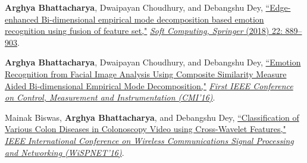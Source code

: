 \documentclass[letterpaper,10pt]{article}
\begin{document}
\item {\textbf{Arghya Bhattacharya}, Dwaipayan Choudhury, and Debangshu Dey, \href{https://doi.org/10.1007/s00500-016-2395-4}{``Edge-enhanced Bi-dimensional empirical mode decomposition based emotion recognition using fusion of feature set,"} \href{https://www.springer.com/journal/500}{\textit{Soft Computing, Springer} (2018) 22: 889--903}.}

\item {\textbf{Arghya Bhattacharya}, Dwaipayan Choudhury, and Debangshu Dey, \href{https://doi.org/10.1109/CMI.2016.7413766}{``Emotion Recognition from Facial Image Analysis Using Composite Similarity Measure Aided Bi-dimensional Empirical Mode Decomposition,"} \href{https://ieeexplore.ieee.org/xpl/conhome/7400053/proceeding}{\textit{First IEEE Conference on Control, Measurement and Instrumentation (CMI’16)}}.}

\item {Mainak Biswas, \textbf{Arghya Bhattacharya}, and Debangshu Dey, \href{https://doi.org/10.1109/WiSPNET.2016.7566521} {``Classification of Various Colon Diseases in Colonoscopy Video using Cross-Wavelet Features,"} \href{https://ieeexplore.ieee.org/xpl/conhome/7561562/proceeding}{\textit{IEEE International Conference on Wireless Communications Signal Processing and Networking (WiSPNET'16)}}.}
\resumePublicationListEnd
\end{document}
